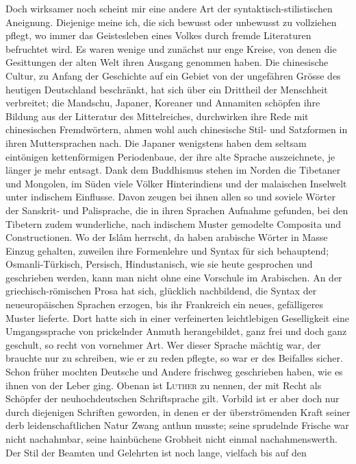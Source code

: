 {Doch wirksamer noch scheint mir eine andere Art der syntaktisch-\label{fp.265}stilist\-ischen Aneignung. Diejenige meine ich, die sich bewusst oder unbewusst zu vollziehen pflegt, wo immer das Geistesleben eines Volkes durch fremde Literaturen befruchtet wird. Es waren wenige und zunächst nur enge Kreise, von denen die Gesittungen der alten Welt ihren Ausgang genommen haben. Die chinesische Cultur, zu Anfang der Geschichte auf ein Gebiet von der ungefähren Grösse des heutigen Deutschland beschränkt, hat sich über ein Drittheil der Menschheit verbreitet; die Mandschu, Japaner, Koreaner und Annamiten schöpfen ihre Bildung aus der Litteratur des Mittelreiches, durchwirken ihre Rede mit chinesischen Fremdwörtern, ahmen wohl auch chinesische Stil- und Satzformen in ihren Muttersprachen nach. Die Japaner wenigstens haben dem seltsam eintönigen kettenförmigen Periodenbaue, der ihre alte Sprache auszeichnete, je länger je mehr entsagt.  Dank dem Buddhismus stehen im Norden die Tibetaner und Mongolen, im Süden viele Völker Hinterindiens und der malaischen Inselwelt unter indischem Einflusse. Davon zeugen bei ihnen allen so und soviele Wörter der Sanskrit- und Palisprache, die in ihren Sprachen Aufnahme gefunden, bei den Tibetern zudem wunderliche, nach indischem Muster gemodelte Composita und Constructionen. Wo der Islâm herrscht, da haben arabische Wörter in Masse Einzug gehalten, zuweilen ihre Formenlehre und Syntax für sich behauptend; Osmanli-Türkisch, Persisch, Hindustanisch, wie sie heute gesprochen und geschrieben werden, kann man nicht  ohne eine Vorschule im Arabischen. An der griechisch-römischen Prosa hat sich, glücklich nachbildend, die Syntax der neueuropäischen Sprachen erzogen, bis ihr Frankreich ein neues, gefälligeres Muster lieferte. Dort hatte sich in einer verfeinerten leichtlebigen Geselligkeit eine Umgangssprache von prickelnder Anmuth herangebildet, ganz frei und doch ganz geschult, so recht von vornehmer Art. Wer dieser Sprache mächtig war, der brauchte nur zu schreiben, wie er zu reden pflegte, so war er des Beifalles sicher. Schon früher mochten Deutsche und Andere frischweg geschrieben haben, wie es ihnen von der Leber ging. Obenan ist \textsc{Luther} zu nennen, der mit Recht als Schöpfer der neuhochdeutschen Schriftsprache gilt. Vorbild ist er aber doch nur durch diejenigen Schriften ge\-\label{sp.272}worden, in denen er der überströmenden Kraft seiner derb leidenschaftlichen Natur Zwang anthun musste; seine sprudelnde Frische war nicht nachahmbar, seine hainbüchene Grobheit nicht einmal nachahmenswerth. Der Stil der Beamten und Gelehrten ist noch lange, vielfach bis auf den }
